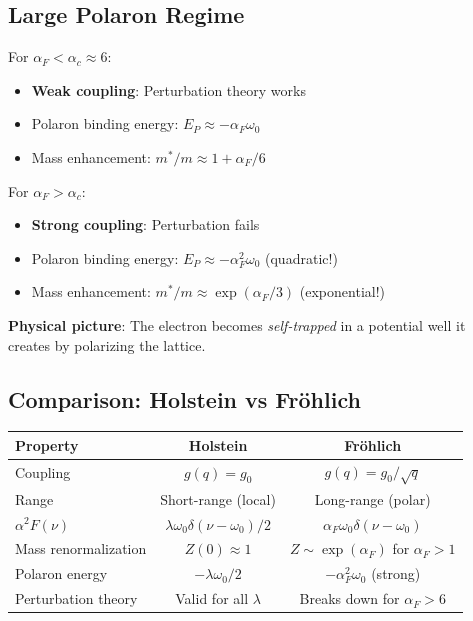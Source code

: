 \documentclass[12pt]{article}
\begin{document}
\subsection{Large Polaron Regime}

For $\alpha_F < \alpha_c \approx 6$:
\begin{itemize}
\item \textbf{Weak coupling}: Perturbation theory works
\item Polaron binding energy: $E_P \approx -\alpha_F \omega_0$
\item Mass enhancement: $m^*/m \approx 1 + \alpha_F/6$
\end{itemize}

For $\alpha_F > \alpha_c$:
\begin{itemize}
\item \textbf{Strong coupling}: Perturbation fails
\item Polaron binding energy: $E_P \approx -\alpha_F^2 \omega_0$ (quadratic!)
\item Mass enhancement: $m^*/m \approx \exp(\alpha_F/3)$ (exponential!)
\end{itemize}

\textbf{Physical picture}: The electron becomes \textit{self-trapped} in a potential well it creates by polarizing the lattice.

\subsection{Comparison: Holstein vs Fr\"ohlich}

\begin{center}
\begin{tabular}{|l|c|c|}
\hline
\textbf{Property} & \textbf{Holstein} & \textbf{Fr\"ohlich} \\
\hline
Coupling & $g(q) = g_0$ & $g(q) = g_0/\sqrt{q}$ \\
Range & Short-range (local) & Long-range (polar) \\
$\alpha^2F(\nu)$ & $\lambda\omega_0\delta(\nu-\omega_0)/2$ & $\alpha_F\omega_0\delta(\nu-\omega_0)$ \\
Mass renormalization & $Z(0) \approx 1$ & $Z \sim \exp(\alpha_F)$ for $\alpha_F > 1$ \\
Polaron energy & $-\lambda\omega_0/2$ & $-\alpha_F^2\omega_0$ (strong) \\
Perturbation theory & Valid for all $\lambda$ & Breaks down for $\alpha_F > 6$ \\
\hline
\end{tabular}
\end{center}
\end{document}
